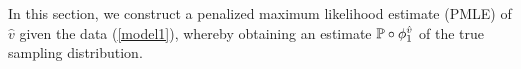 \documentclass[noinfoline]{imsart}
\begin{document}
%
%
In this section, we construct a penalized maximum likelihood estimate (PMLE) of $\hat v$ given the data (\ref{model1}), whereby obtaining an estimate $ \Bbb P\circ \phi^{\hat v}_1$ of the true sampling  distribution.
\end{document}
